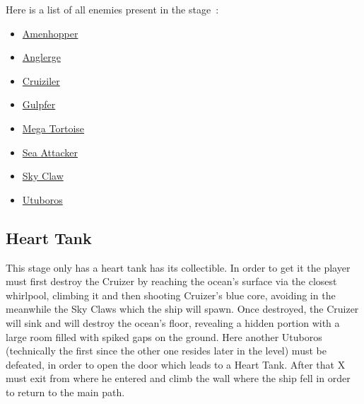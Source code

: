 Here is a list of all enemies present in the stage~\cite{wiki:Ocean}:
\begin{itemize}
	\item \hyperlink{enem:Amenhopper}{Amenhopper}
	\item \hyperlink{miniboss:Anglerge}{Anglerge}
	\item \hyperlink{miniboss:Cruiziler}{Cruiziler}
	\item \hyperlink{enem:Gulpfer}{Gulpfer }
	\item \hyperlink{enem:Mega_Tortoise}{Mega Tortoise }
	\item \hyperlink{enem:Sea_Attacker}{Sea Attacker}
	\item \hyperlink{enem:Sky_Claw}{Sky Claw }
	\item \hyperlink{miniboss:Utuboros}{Utuboros}
\end{itemize}

\subsection{Heart Tank}
This stage only has a heart tank has its collectible. In order to get it the player must first destroy the Cruizer by reaching the ocean's surface via the closest whirlpool, climbing it and then shooting Cruizer's blue core, avoiding in the meanwhile the Sky Claws which the ship will spawn. Once destroyed, the Cruizer will sink and will destroy the ocean's floor, revealing a hidden portion with a large room filled with spiked gaps on the ground. Here another Utuboros (technically the first since the other one resides later in the level) must be defeated, in order to open the door which leads to a Heart Tank. After that X must exit from where he entered and climb the wall where the ship fell in order to return to the main path.


